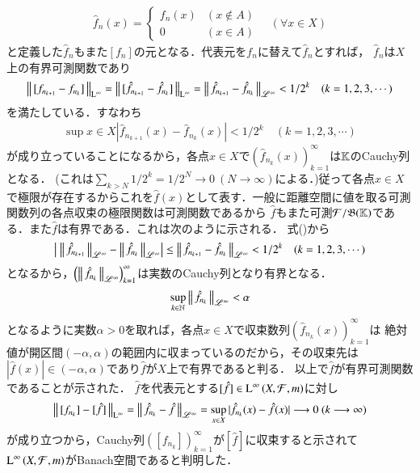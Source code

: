 \begin{qst}
\begin{prf}
\begin{description}
\begin{align}
				\hat{f}_n(x) =
				\begin{cases}
					f_n(x) & (x \notin A) \\
					0 & (x \in A)
				\end{cases}
				\quad (\forall x \in X)
			\end{align}
			と定義した$\hat{f}_n$もまた$[f_n]$の元となる．代表元を$f_n$に替えて$\hat{f}_n$とすれば，
			$\hat{f}_n$は$X$上の有界可測関数であり
			\begin{align}
				\left\|\, [f_{n_{k+1}} - f_{n_k}]\, \right\|_{\mathrm{L}^\infty} = \left\|\, [\hat{f}_{n_{k+1}} - \hat{f}_{n_k}]\, \right\|_{\mathrm{L}^\infty}
				= \left\|\, \hat{f}_{n_{k+1}} - \hat{f}_{n_k}\, \right\|_{\mathscr{L}^\infty} < 1/2^k \quad (k=1,2,3,\cdots) \label{ineq:Lp_banach_1}
			\end{align}
			を満たしている．すなわち
			\begin{align}
				\sup{x \in X}{|\hat{f}_{n_{k+1}}(x) - \hat{f}_{n_k}(x)|} < 1/2^k \quad (k=1,2,3,\cdots) 
			\end{align}
			が成り立っていることになるから，各点$x \in X$で$\left( \hat{f}_{n_k}(x) \right)_{k=1}^{\infty}$は$\mathbb{K}$のCauchy列となる．
			(これは$\sum_{k > N} 1/2^k = 1/2^N \longrightarrow 0\ (N \longrightarrow \infty)$による．)従って各点$x \in X$
			で極限が存在するからこれを$\hat{f}(x)$として表す．一般に距離空間に値を取る可測関数列の各点収束の極限関数は可測関数であるから
			$\hat{f}$もまた可測$\mathcal{F}/\mathfrak{B}(\mathbb{K})$である．また$\hat{f}$は有界である．これは次のように示される．
			式()から
			\begin{align}
				\left|\ \left\|\, \hat{f}_{n_{k+1}}\, \right\|_{\mathscr{L}^\infty} - \left\|\, \hat{f}_{n_k}\, \right\|_{\mathscr{L}^\infty} \right| 
				\leq \left\|\, \hat{f}_{n_{k+1}} - \hat{f}_{n_k}\, \right\|_{\mathscr{L}^\infty} < 1/2^k \quad (k=1,2,3,\cdots)
			\end{align}
			となるから，$\left( \left\|\, \hat{f}_{n_k}\, \right\|_{\mathscr{L}^\infty} \right)_{k=1}^{\infty}$は実数のCauchy列となり有界となる．
			\begin{align}
				\operatorname*{sup}_{k \in \mathbb{N}} \left\|\, \hat{f}_{n_k}\, \right\|_{\mathscr{L}^\infty} < \alpha
			\end{align}
			となるように実数$\alpha > 0$を取れば，各点$x \in X$で収束数列$\left( \hat{f}_{n_k}(x) \right)_{k=1}^{\infty}$は
			絶対値が開区間$(-\alpha,\alpha)$の範囲内に収まっているのだから，その収束先は$|\hat{f}(x)| \in (-\alpha,\alpha)$であり$\hat{f}$が$X$上で有界であると判る．
			以上で$\hat{f}$が有界可測関数であることが示された．
			$\hat{f}$を代表元とする$[\hat{f}] \in \operatorname{L}^{\infty} \left(X,\mathcal{F},m\right)$に対し
			\begin{align}
				\left\|\, [f_{n_k}] - [\hat{f}]\, \right\|_{\mathrm{L}^\infty} = \left\|\, \hat{f}_{n_k} - \hat{f}\, \right\|_{\mathscr{L}^\infty} 
				= \operatorname*{sup}_{x \in X} |\hat{f}_{n_k}(x) - \hat{f}(x)|
				\longrightarrow 0 \ (k \longrightarrow \infty)
			\end{align}
			が成り立つから，Cauchy列$\left( [f_{n_k}] \right)_{k=1}^{\infty}$が$[\hat{f}]$に収束すると示されて
			$\operatorname{L}^{\infty} \left(X,\mathcal{F},m\right)$がBanach空間であると判明した．
			

\end{description}
\end{prf}
\end{qst}

